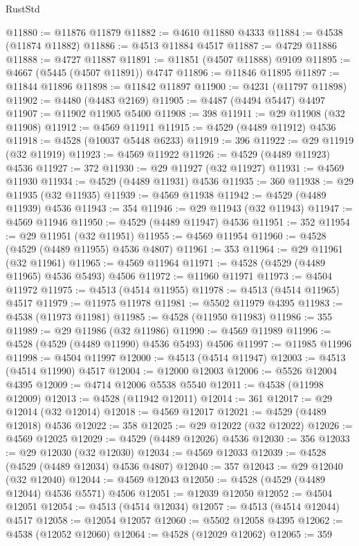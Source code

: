 \begin{lexlean}{RustStd}
\begin{coremodule}
@11880 := @11876 @11879
@11882 := @4610 @11880 @4333
@11884 := @4538 (@11874 @11882)
@11886 := @4513 @11884 @4517
@11887 := @4729 @11886
@11888 := @4727 @11887
@11891 := @11851 (@4507 @11888) @9109
@11895 := @4667 (@5445 (@4507 @11891)) @4747
@11896 := @11846 @11895
@11897 := @11844 @11896
@11898 := @11842 @11897
@11900 := @4231 (@11797 @11898)
@11902 := @4480 (@4483 @2169)
@11905 := @4487 (@4494 @5447) @4497
@11907 := @11902 @11905 @5400
@11908 := 398
@11911 := @29 @11908 (@32 @11908)
@11912 := @4569 @11911
@11915 := @4529 (@4489 @11912) @4536
@11918 := @4528 (@10037 @5448 @6233)
@11919 := 396
@11922 := @29 @11919 (@32 @11919)
@11923 := @4569 @11922
@11926 := @4529 (@4489 @11923) @4536
@11927 := 372
@11930 := @29 @11927 (@32 @11927)
@11931 := @4569 @11930
@11934 := @4529 (@4489 @11931) @4536
@11935 := 360
@11938 := @29 @11935 (@32 @11935)
@11939 := @4569 @11938
@11942 := @4529 (@4489 @11939) @4536
@11943 := 354
@11946 := @29 @11943 (@32 @11943)
@11947 := @4569 @11946
@11950 := @4529 (@4489 @11947) @4536
@11951 := 352
@11954 := @29 @11951 (@32 @11951)
@11955 := @4569 @11954
@11960 := @4528 (@4529 (@4489 @11955) @4536 @4807)
@11961 := 353
@11964 := @29 @11961 (@32 @11961)
@11965 := @4569 @11964
@11971 := @4528 (@4529 (@4489 @11965) @4536 @5493) @4506
@11972 := @11960 @11971
@11973 := @4504 @11972
@11975 := @4513 (@4514 @11955)
@11978 := @4513 (@4514 @11965) @4517
@11979 := @11975 @11978
@11981 := @5502 @11979 @4395
@11983 := @4538 (@11973 @11981)
@11985 := @4528 (@11950 @11983)
@11986 := 355
@11989 := @29 @11986 (@32 @11986)
@11990 := @4569 @11989
@11996 := @4528 (@4529 (@4489 @11990) @4536 @5493) @4506
@11997 := @11985 @11996
@11998 := @4504 @11997
@12000 := @4513 (@4514 @11947)
@12003 := @4513 (@4514 @11990) @4517
@12004 := @12000 @12003
@12006 := @5526 @12004 @4395
@12009 := @4714 @12006 @5538 @5540
@12011 := @4538 (@11998 @12009)
@12013 := @4528 (@11942 @12011)
@12014 := 361
@12017 := @29 @12014 (@32 @12014)
@12018 := @4569 @12017
@12021 := @4529 (@4489 @12018) @4536
@12022 := 358
@12025 := @29 @12022 (@32 @12022)
@12026 := @4569 @12025
@12029 := @4529 (@4489 @12026) @4536
@12030 := 356
@12033 := @29 @12030 (@32 @12030)
@12034 := @4569 @12033
@12039 := @4528 (@4529 (@4489 @12034) @4536 @4807)
@12040 := 357
@12043 := @29 @12040 (@32 @12040)
@12044 := @4569 @12043
@12050 := @4528 (@4529 (@4489 @12044) @4536 @5571) @4506
@12051 := @12039 @12050
@12052 := @4504 @12051
@12054 := @4513 (@4514 @12034)
@12057 := @4513 (@4514 @12044) @4517
@12058 := @12054 @12057
@12060 := @5502 @12058 @4395
@12062 := @4538 (@12052 @12060)
@12064 := @4528 (@12029 @12062)
@12065 := 359

\end{coremodule}
\end{lexlean}
